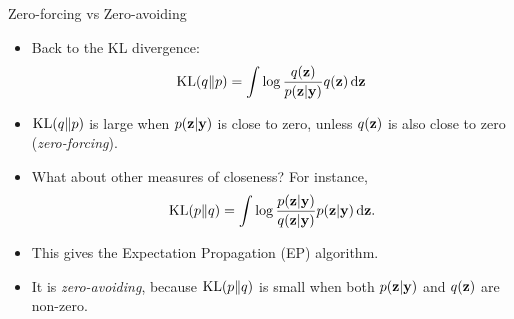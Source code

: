 \begin{frame}{Zero-forcing vs Zero-avoiding}
  \begin{itemize}
    \item Back to the KL divergence:
    \[
      \operatorname{KL}(q \Vert p) = \int \log \frac{q({\mathbf z})}{p({\mathbf z}|{\mathbf y})} q({\mathbf z}) \, \text{d}{\mathbf z}
    \]
    \item $\operatorname{KL}(q \Vert p)$ is large when $p({\mathbf z}|{\mathbf y})$ is close to zero, unless $q({\mathbf z})$ is also close to zero (\emph{zero-forcing}).
    \item What about other measures of closeness? \pause For instance,
    \[
      \operatorname{KL}(p \Vert q) = \int \log \frac{p({\mathbf z}|{\mathbf y})}{q({\mathbf z}|{\mathbf y})} p({\mathbf z}|{\mathbf y}) \, \text{d}{\mathbf z}.
    \]
    \item This gives the Expectation Propagation (EP) algorithm. 
    \item It is \emph{zero-avoiding}, because $\operatorname{KL}(p\Vert q)$ is small when both $p({\mathbf z}|{\mathbf y})$ and $q({\mathbf z})$ are non-zero.
  \end{itemize}
\end{frame}

